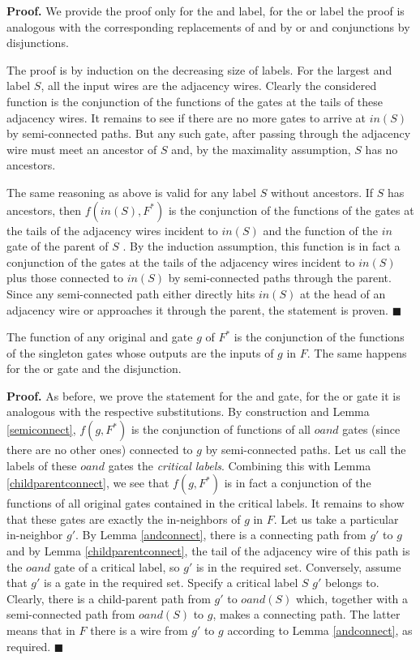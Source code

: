 \documentclass{llncs}
\begin{document}
{\bf Proof.} 
We provide the proof only for the {\sc and} label, for the {\sc or} label
the proof is analogous with the corresponding replacements of {\sc and} by {\sc or} and conjunctions by disjunctions.

The proof is by induction on the decreasing size 
of labels. For the largest {\sc and} label $S$, all the input wires are the adjacency wires. Clearly the considered function is the conjunction of the functions of the gates at the tails of these adjacency wires. It remains to see if there are no more gates to arrive at $in(S)$ by semi-connected paths. But any such gate, after passing through the adjacency wire must meet an ancestor of $S$ and, by the maximality assumption, $S$ has
no ancestors.

The same reasoning as above is valid for any label $S$ without ancestors. If $S$ has ancestors, then $f(in(S),F^*)$
is the conjunction of the functions of the gates at the tails
of the adjacency wires incident to $in(S)$ and the function of the $in$ gate of the parent of $S$ . By the induction assumption, this function is in fact a conjunction of the gates at the tails of the adjacency wires incident to $in(S)$ plus those connected to $in(S)$ by semi-connected paths through the parent. Since any semi-connected path either directly hits $in(S)$ at the head of an adjacency wire or approaches it through the parent, the statement is proven. $\blacksquare$



\begin{lemma} \label{andorfunction}
The function of any original {\sc and} gate $g$ of $F^*$
is the conjunction of the functions of the singleton gates whose outputs are the inputs of $g$ in $F$.
The same happens for the {\sc or} gate and the disjunction. 
\end{lemma}

{\bf Proof.}
As before, we prove the statement for the {\sc and} gate, for the {\sc or} gate it is analogous with the respective substitutions. 
By construction and Lemma \ref{semiconnect}, $f(g,F^*)$
is the conjunction of functions of all $oand$ gates (since there are no other ones) connected to $g$ by semi-connected paths. 
Let us call the labels of these $oand$ gates the \emph{critical labels}. Combining this with Lemma \ref{childparentconnect}, we see that $f(g,F^*)$ is in fact a conjunction of the functions
of all original gates contained in the critical labels. It remains to show that
these gates are exactly the in-neighbors of $g$ in $F$. Let us take a particular in-neighbor $g'$.
By Lemma \ref{andconnect}, there is a connecting path from $g'$ to $g$ and by Lemma \ref{childparentconnect},
the tail of the adjacency wire of this path is 
the $oand$ gate of a critical label, so $g'$ is in the required set. Conversely, assume that $g'$ is a gate in the required set.
Specify a critical label $S$ $g'$ belongs to. Clearly, there is a child-parent path from $g'$ to $oand(S)$ which, together with a semi-connected path from $oand(S)$ to $g$, makes a connecting path. The latter means that in $F$ there is a wire from $g'$ to $g$ according to Lemma \ref{andconnect}, as required.
$\blacksquare$
\end{document}
